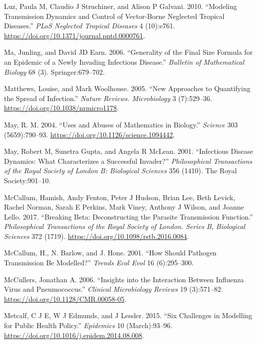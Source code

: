 \documentclass[]{book}
\theoremstyle{definition}
\theoremstyle{definition}
\theoremstyle{definition}
\theoremstyle{remark}
\begin{document}
\leavevmode\hypertarget{ref-luz10}{}%
Luz, Paula M, Claudio J Struchiner, and Alison P Galvani. 2010.
``Modeling Transmission Dynamics and Control of Vector-Borne Neglected
Tropical Diseases.'' \emph{PLoS Neglected Tropical Diseases} 4
(10):e761. \url{https://doi.org/10.1371/journal.pntd.0000761}.

\leavevmode\hypertarget{ref-ma06}{}%
Ma, Junling, and David JD Earn. 2006. ``Generality of the Final Size
Formula for an Epidemic of a Newly Invading Infectious Disease.''
\emph{Bulletin of Mathematical Biology} 68 (3). Springer:679--702.

\leavevmode\hypertarget{ref-matthews05}{}%
Matthews, Louise, and Mark Woolhouse. 2005. ``New Approaches to
Quantifying the Spread of Infection.'' \emph{Nature Reviews.
Microbiology} 3 (7):529--36. \url{https://doi.org/10.1038/nrmicro1178}.

\leavevmode\hypertarget{ref-may04}{}%
May, R. M. 2004. ``Uses and Abuses of Mathematics in Biology.''
\emph{Science} 303 (5659):790--93.
\url{https://doi.org/10.1126/science.1094442}.

\leavevmode\hypertarget{ref-may01}{}%
May, Robert M, Sunetra Gupta, and Angela R McLean. 2001. ``Infectious
Disease Dynamics: What Characterizes a Successful Invader?''
\emph{Philosophical Transactions of the Royal Society of London B:
Biological Sciences} 356 (1410). The Royal Society:901--10.

\leavevmode\hypertarget{ref-mccallum17}{}%
McCallum, Hamish, Andy Fenton, Peter J Hudson, Brian Lee, Beth Levick,
Rachel Norman, Sarah E Perkins, Mark Viney, Anthony J Wilson, and Joanne
Lello. 2017. ``Breaking Beta: Deconstructing the Parasite Transmission
Function.'' \emph{Philosophical Transactions of the Royal Society of
London. Series B, Biological Sciences} 372 (1719).
\url{https://doi.org/10.1098/rstb.2016.0084}.

\leavevmode\hypertarget{ref-mccallum01}{}%
McCallum, H., N. Barlow, and J. Hone. 2001. ``How Should Pathogen
Transmission Be Modelled?'' \emph{Trends Ecol Evol} 16 (6):295--300.

\leavevmode\hypertarget{ref-mccullers06}{}%
McCullers, Jonathan A. 2006. ``Insights into the Interaction Between
Influenza Virus and Pneumococcus.'' \emph{Clinical Microbiology Reviews}
19 (3):571--82. \url{https://doi.org/10.1128/CMR.00058-05}.

\leavevmode\hypertarget{ref-metcalf15}{}%
Metcalf, C J E, W J Edmunds, and J Lessler. 2015. ``Six Challenges in
Modelling for Public Health Policy.'' \emph{Epidemics} 10
(March):93--96. \url{https://doi.org/10.1016/j.epidem.2014.08.008}.
\end{document}
